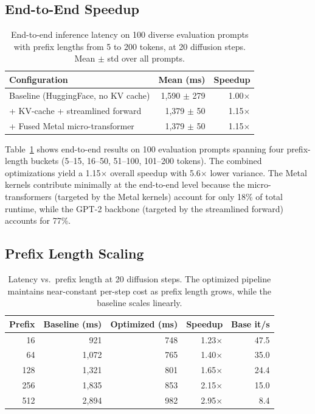 \documentclass[sigconf,authordraft]{acmart}
\begin{document}
\subsection{End-to-End Speedup}

\begin{table}[t]
\caption{End-to-end inference latency on 100 diverse evaluation prompts with prefix lengths from 5 to 200 tokens, at 20 diffusion steps. Mean $\pm$ std over all prompts.}
\label{tab:e2e}
\begin{tabular}{lrr}
\toprule
Configuration & Mean (ms) & Speedup \\
\midrule
Baseline (HuggingFace, no KV cache) & 1{,}590 $\pm$ 279 & 1.00$\times$ \\
+ KV-cache + streamlined forward & 1{,}379 $\pm$ 50 & 1.15$\times$ \\
\quad + Fused Metal micro-transformer & 1{,}379 $\pm$ 50 & 1.15$\times$ \\
\bottomrule
\end{tabular}
\end{table}

Table~\ref{tab:e2e} shows end-to-end results on 100 evaluation prompts spanning four prefix-length buckets (5--15, 16--50, 51--100, 101--200 tokens). The combined optimizations yield a 1.15$\times$ overall speedup with 5.6$\times$ lower variance. The Metal kernels contribute minimally at the end-to-end level because the micro-transformers (targeted by the Metal kernels) account for only 18\% of total runtime, while the GPT-2 backbone (targeted by the streamlined forward) accounts for 77\%.

\subsection{Prefix Length Scaling}

\begin{table}[t]
\caption{Latency vs.\ prefix length at 20 diffusion steps. The optimized pipeline maintains near-constant per-step cost as prefix length grows, while the baseline scales linearly.}
\label{tab:prefix}
\begin{tabular}{rrrrr}
\toprule
Prefix & Baseline (ms) & Optimized (ms) & Speedup & Base it/s \\
\midrule
16 & 921 & 748 & 1.23$\times$ & 47.5 \\
64 & 1{,}072 & 765 & 1.40$\times$ & 35.0 \\
128 & 1{,}321 & 801 & 1.65$\times$ & 24.4 \\
256 & 1{,}835 & 853 & 2.15$\times$ & 15.0 \\
512 & 2{,}894 & 982 & 2.95$\times$ & 8.4 \\
\bottomrule
\end{tabular}
\end{table}
\end{document}
